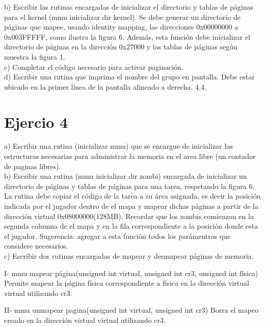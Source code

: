 \documentclass[a4paper]{article}
\begin{document}
{\large b)} Escribir las rutinas encargadas de inicializar el directorio y tablas de p\'aginas para el kernel
(mmu inicializar dir kernel). Se debe generar un directorio de p\'aginas que mapee,
usando identity mapping, las direcciones 0x00000000 a 0x003FFFFF, como ilustra la figura
6. Adem\'as, esta funci\'on debe inicializar el directorio de p\'aginas en la direcci\'on 0x27000
y las tablas de p\'aginas seg\'un muestra la figura 1.\\

{\large c)} Completar el c\'odigo necesario para activar paginaci\'on.\\

{\large d)} Escribir una rutina que imprima el nombre del grupo en pantalla. Debe estar ubicado en
la primer l\'inea de la pantalla alineado a derecha.
4.4.

\newpage
\section{Ejercio 4}
{\large a)} Escribir una rutina (inicializar mmu) que se encargue de inicializar las estructuras necesarias
para administrar la memoria en el area libre (un contador de paginas libres).\\

{\large b)} Escribir una rutina (mmu inicializar dir zombi) encargada de inicializar un directorio
de p\'aginas y tablas de p\'aginas para una tarea, respetando la figura 6. La rutina debe copiar
el c\'odigo de la tarea a su \'area asignada, es decir la posici\'on indicada por el jugador dentro
de el mapa y mapear dichas p\'aginas a partir de la direcci\'on virtual 0x08000000(128MB).
Recordar que los zombis comienzan en la segunda columna de el mapa y en la fila correspondiente
a la posici\'on donde esta el jugador. Sugerencia: agregar a esta funci\'on todos los
par\'amentros que considere necesarios.\\

{\large c)} Escribir dos rutinas encargadas de mapear y desmapear p\'aginas de memoria.

I- mmu mapear p\'agina(unsigned int virtual, unsigned int cr3, unsigned int f\'isica)
Permite mapear la p\'agina f\'isica correspondiente a f\'isica en la direcci\'on virtual
virtual utilizando cr3.

II- mmu unmapear pagina(unsigned int virtual, unsigned int cr3)
Borra el mapeo creado en la direcci\'on virtual virtual utilizando cr3. \\
\end{document}
